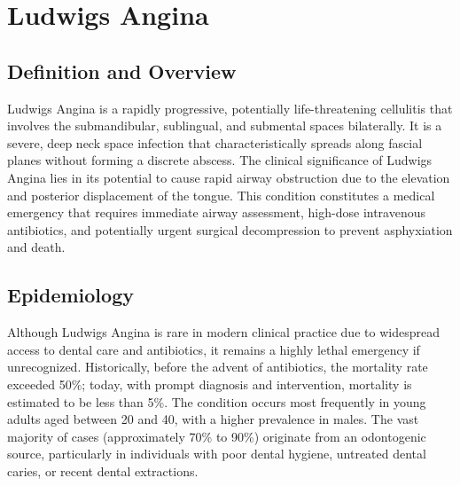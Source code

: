 \chapter{Ludwigs Angina}

\section*{Definition and Overview}
Ludwigs Angina is a rapidly progressive, potentially life-threatening cellulitis that involves the submandibular, sublingual, and submental spaces bilaterally. It is a severe, deep neck space infection that characteristically spreads along fascial planes without forming a discrete abscess. The clinical significance of Ludwigs Angina lies in its potential to cause rapid airway obstruction due to the elevation and posterior displacement of the tongue. This condition constitutes a medical emergency that requires immediate airway assessment, high-dose intravenous antibiotics, and potentially urgent surgical decompression to prevent asphyxiation and death.

\section*{Epidemiology}
Although Ludwigs Angina is rare in modern clinical practice due to widespread access to dental care and antibiotics, it remains a highly lethal emergency if unrecognized. Historically, before the advent of antibiotics, the mortality rate exceeded 50\%; today, with prompt diagnosis and intervention, mortality is estimated to be less than 5\%. The condition occurs most frequently in young adults aged between 20 and 40, with a higher prevalence in males. The vast majority of cases (approximately 70\% to 90\%) originate from an odontogenic source, particularly in individuals with poor dental hygiene, untreated dental caries, or recent dental extractions.

